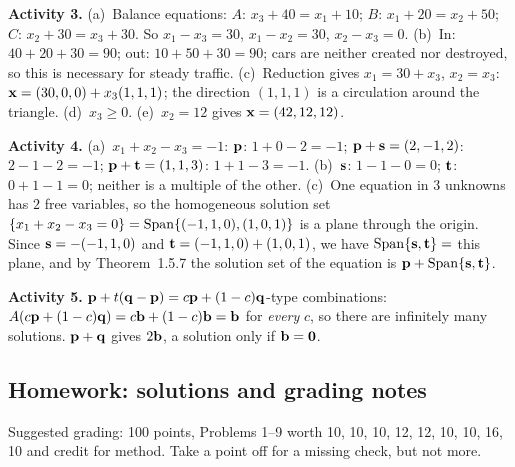 \documentclass[11pt]{article}
\begin{document}
\begin{sol}
\textbf{Activity 3.} (a)~Balance equations: $A$: $x_3+40=x_1+10$; $B$: $x_1+20=x_2+50$; $C$: $x_2+30=x_3+30$. So $x_1-x_3=30$, $x_1-x_2=30$, $x_2-x_3=0$. (b)~In: $40+20+30=90$; out: $10+50+30=90$; cars are neither created nor destroyed, so this is necessary for steady traffic. (c)~Reduction gives $x_1=30+x_3$, $x_2=x_3$: $\mathbf{x}=(30,0,0)+x_3(1,1,1)$; the direction $(1,1,1)$ is a circulation around the triangle. (d)~$x_3\ge0$. (e)~$x_2=12$ gives $\mathbf{x}=(42,12,12)$.

\textbf{Activity 4.} (a)~$x_1+x_2-x_3=-1$: $\mathbf{p}$: $1+0-2=-1$; $\mathbf{p}+\mathbf{s}=(2,-1,2)$: $2-1-2=-1$; $\mathbf{p}+\mathbf{t}=(1,1,3)$: $1+1-3=-1$. (b)~$\mathbf{s}$: $1-1-0=0$; $\mathbf{t}$: $0+1-1=0$; neither is a multiple of the other. (c)~One equation in $3$ unknowns has $2$ free variables, so the homogeneous solution set $\{x_1+x_2-x_3=0\}=\operatorname{Span}\{(-1,1,0),(1,0,1)\}$ is a plane through the origin. Since $\mathbf{s}=-(-1,1,0)$ and $\mathbf{t}=(-1,1,0)+(1,0,1)$, we have $\operatorname{Span}\{\mathbf{s},\mathbf{t}\}=$ this plane, and by Theorem~1.5.7 the solution set of the equation is $\mathbf{p}+\operatorname{Span}\{\mathbf{s},\mathbf{t}\}$.

\textbf{Activity 5.} $\mathbf{p}+t(\mathbf{q}-\mathbf{p})=c\mathbf{p}+(1-c)\mathbf{q}$-type combinations: $A(c\mathbf{p}+(1-c)\mathbf{q})=c\mathbf{b}+(1-c)\mathbf{b}=\mathbf{b}$ for \emph{every} $c$, so there are infinitely many solutions. $\mathbf{p}+\mathbf{q}$ gives $2\mathbf{b}$, a solution only if $\mathbf{b}=\mathbf{0}$.
\end{sol}

\subsection*{Homework: solutions and grading notes}
Suggested grading: 100 points, Problems 1--9 worth 10, 10, 10, 12, 12, 10, 10, 16, 10 and credit for method. Take a point off for a missing check, but not more.
\end{document}
